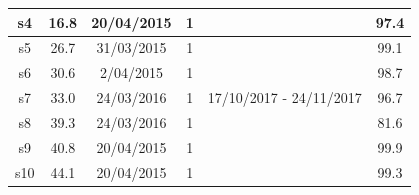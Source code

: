 \begin{table}
\begin{tabular}{|c|c|c|c|c|c|}
\hline
s4                                                  & 16.8                                                    & 20/04/2015                                                & 1                                                       &                         & 97.4                                                                    \\ 
\hline
s5                                                  & 26.7                                                    & 31/03/2015                                                & 1                                                       &                         & 99.1                                                                    \\ 
\hline
s6                                                  & 30.6                                                    & 2/04/2015                                                 & 1                                                       &                         & 98.7                                                                    \\ 
\hline
s7                                                  & 33.0                                                    & 24/03/2016                                                & 1                                                       & 17/10/2017 - 24/11/2017 & 96.7                                                                    \\ 
\hline
s8                                                  & 39.3                                                    & 24/03/2016                                                & 1                                                       &                         & 81.6                                                                    \\ 
\hline
s9                                                  & 40.8                                                    & 20/04/2015                                                & 1                                                       &                         & 99.9                                                                    \\ 
\hline
s10                                                 & 44.1                                                    & 20/04/2015                                                & 1                                                       &                         & 99.3                                                                    \\ 

\end{tabular}
\end{table}
